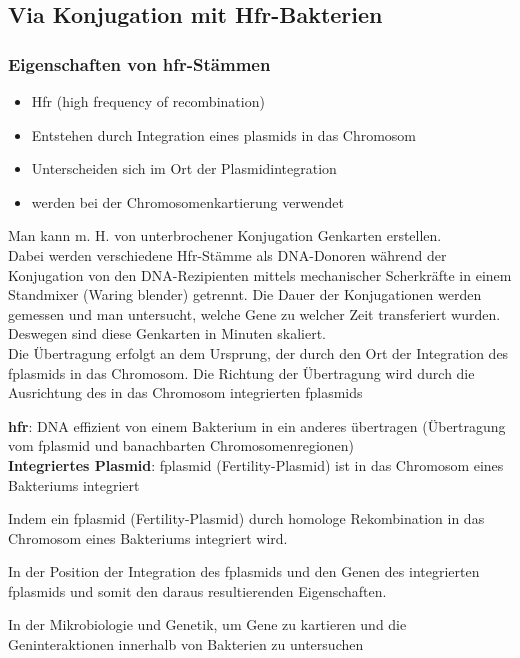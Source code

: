 \subsection{Via Konjugation mit Hfr-Bakterien}
 
\subsubsection{Eigenschaften von hfr-Stämmen}
\begin{itemize}
    \item Hfr (high frequency of recombination)
    \item Entstehen durch Integration eines \gls{plasmid}s in das Chromosom
    \item Unterscheiden sich im Ort der Plasmidintegration 
    \item werden bei der Chromosomenkartierung  verwendet
\end{itemize}
Man kann m. H. von unterbrochener Konjugation Genkarten erstellen. \\
 Dabei werden verschiedene Hfr-Stämme als DNA-Donoren während der Konjugation von den DNA-Rezipienten mittels mechanischer Scherkräfte in einem Standmixer (Waring blender) getrennt. Die Dauer der Konjugationen werden gemessen und man untersucht, welche Gene zu welcher Zeit transferiert wurden. Deswegen sind diese Genkarten in Minuten skaliert. \\
 Die Übertragung erfolgt an dem Ursprung, der durch den Ort der Integration des \gls{fplasmid}s in das Chromosom. Die Richtung der Übertragung wird durch die Ausrichtung des in das Chromosom integrierten \gls{fplasmid}s
\begin{mechanism}[title=Wodurch zeichnen sich bakterielle HFR-Stämme aus?]
\textbf{hfr}: DNA effizient von einem Bakterium in ein anderes übertragen (Übertragung vom \gls{fplasmid} und banachbarten Chromosomenregionen) \\
\textbf{Integriertes Plasmid}: \gls{fplasmid} (Fertility-Plasmid) ist in das Chromosom eines Bakteriums integriert 
\end{mechanism}
\begin{mechanism}[title=Wie entstehen bakterielle HFR-Stämme?]
Indem ein \gls{fplasmid} (Fertility-Plasmid) durch homologe Rekombination in das Chromosom eines Bakteriums integriert wird. 
\end{mechanism}
\begin{mechanism}[title=Worin unterscheiden sich unterschiedliche HFR-Stämme?]
In der Position der Integration des \gls{fplasmid}s und den Genen des integrierten \gls{fplasmid}s und somit den daraus resultierenden Eigenschaften.
\end{mechanism}
\begin{mechanism}[title=Wofür werden HFR-Stämme verwendet?]
In der Mikrobiologie und Genetik, um Gene zu kartieren und die Geninteraktionen innerhalb von Bakterien zu untersuchen
\end{mechanism}


